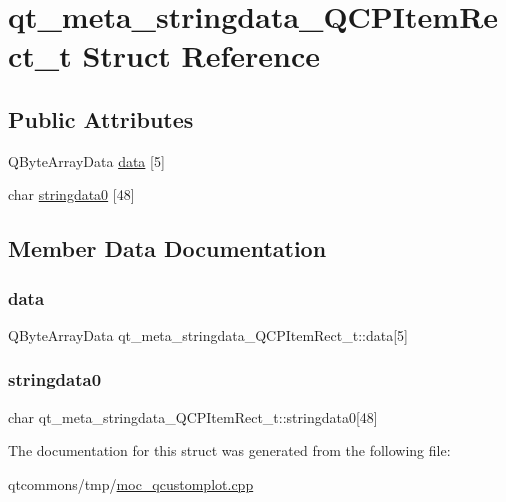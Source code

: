 \hypertarget{structqt__meta__stringdata___q_c_p_item_rect__t}{}\section{qt\+\_\+meta\+\_\+stringdata\+\_\+\+Q\+C\+P\+Item\+Rect\+\_\+t Struct Reference}
\label{structqt__meta__stringdata___q_c_p_item_rect__t}
\subsection*{Public Attributes}
\begin{DoxyCompactItemize}
\item 
Q\+Byte\+Array\+Data \mbox{\hyperlink{structqt__meta__stringdata___q_c_p_item_rect__t_ab5a84b5db36cb982466a0b732f5e090f}{data}} \mbox{[}5\mbox{]}
\item 
char \mbox{\hyperlink{structqt__meta__stringdata___q_c_p_item_rect__t_a216a9c8bff154ce0d04ce8eb79a5d408}{stringdata0}} \mbox{[}48\mbox{]}
\end{DoxyCompactItemize}


\subsection{Member Data Documentation}
\mbox{\label{structqt__meta__stringdata___q_c_p_item_rect__t_ab5a84b5db36cb982466a0b732f5e090f}} 
\subsubsection{\texorpdfstring{data}{data}}
{\footnotesize\ttfamily Q\+Byte\+Array\+Data qt\+\_\+meta\+\_\+stringdata\+\_\+\+Q\+C\+P\+Item\+Rect\+\_\+t\+::data\mbox{[}5\mbox{]}}

\mbox{\label{structqt__meta__stringdata___q_c_p_item_rect__t_a216a9c8bff154ce0d04ce8eb79a5d408}} 
\subsubsection{\texorpdfstring{stringdata0}{stringdata0}}
{\footnotesize\ttfamily char qt\+\_\+meta\+\_\+stringdata\+\_\+\+Q\+C\+P\+Item\+Rect\+\_\+t\+::stringdata0\mbox{[}48\mbox{]}}



The documentation for this struct was generated from the following file\+:\begin{DoxyCompactItemize}
\item 
qtcommons/tmp/\mbox{\hyperlink{moc__qcustomplot_8cpp}{moc\+\_\+qcustomplot.\+cpp}}\end{DoxyCompactItemize}
